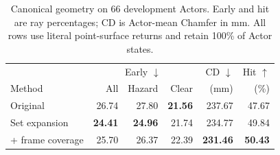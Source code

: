 \begin{table}[t]
\centering\footnotesize
\setlength{\tabcolsep}{3pt}
\caption{Canonical geometry on 66 development Actors. Early and hit are ray percentages; CD is Actor-mean Chamfer in mm.
All rows use literal point-surface returns and retain 100\% of Actor states.}
\label{tab:eas-geometry}
\begin{tabular}{lrrrrr}
\toprule
& \multicolumn{3}{c}{Early $\downarrow$} & CD $\downarrow$ & Hit $\uparrow$\\
Method & All & Hazard & Clear & (mm) & (\%)\\
\midrule
Original & 26.74 & 27.80 & \textbf{21.56} & 237.67 & 47.67 \\
Set expansion & \textbf{24.41} & \textbf{24.96} & 21.74 & 234.77 & 49.84 \\
+ frame coverage & 25.70 & 26.37 & 22.39 & \textbf{231.46} & \textbf{50.43} \\
\bottomrule
\end{tabular}
\end{table}
